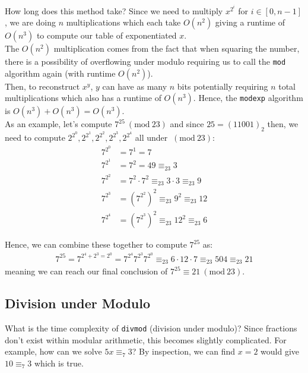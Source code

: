 \documentclass[14pt]{extarticle}
\newcommand{\Mod}[1]{\ (\mathrm{mod}\ #1)}
\begin{document}
    How long does this method take? Since we need to multiply $x^{2^i}$ for
    $i\in [0, n-1]$, we are doing $n$ multiplications which each take $O(n^2)$
    giving a runtime of $O(n^3)$ to compute our table of exponentiated $x$.\\

    The $O(n^2)$ multiplication comes from the fact that when squaring the
    number, there is a possibility of overflowing under modulo requiring us
    to call the \texttt{mod} algorithm again (with runtime $O(n^2)$).\\

    Then, to reconstruct $x^y$, $y$ can have as many $n$ bits potentially
    requiring $n$ total multiplications which also has a runtime of $O(n^3)$.
    Hence, the \texttt{modexp} algorithm is $O(n^3) + O(n^3) = O(n^3)$.\\

    As an example, let's compute $7^{25} \Mod{23}$ and since $25 = (11001)_2$
    then, we need to compute $2^{2^0}, 2^{2^1}, 2^{2^2}, 2^{2^3}, 2^{2^4}$ 
    all under $\Mod{23}$:
    \begin{align*}
        7^{2^0} &= 7^1 = 7                                              \\
        7^{2^1} &= 7^2 = 49 \equiv_{23} 3                               \\
        7^{2^2} &= 7^2 \cdot 7^2 \equiv_{23} 3\cdot 3\equiv_{23} 9      \\
        7^{2^3} &= (7^{2^2})^2 \equiv_{23} 9^2 \equiv_{23} 12           \\
        7^{2^4} &= (7^{2^3})^2 \equiv_{23} 12^2 \equiv_{23} 6
    \end{align*}

    Hence, we can combine these together to compute $7^{25}$ as:
    \begin{align*}
        7^{25} = 7^{2^4 + 2^3 = 2^0} = 7^{2^4} 7^{2^3} 7^{2^0} \equiv_{23}
        6\cdot 12\cdot 7\equiv_{23} 504 \equiv_{23} 21
    \end{align*}
    meaning we can reach our final conclusion of $7^{25} \equiv 21 \Mod{23}$.\\

    \subsection{Division under Modulo}
    What is the time complexity of \texttt{divmod} (division under modulo)?
    Since fractions don't exist within modular arithmetic, this becomes
    slightly complicated. For example, how can we solve $5x \equiv_7 3$? By
    inspection, we can find $x = 2$ would give $10 \equiv_7 3$ which is true.\\
\end{document}
